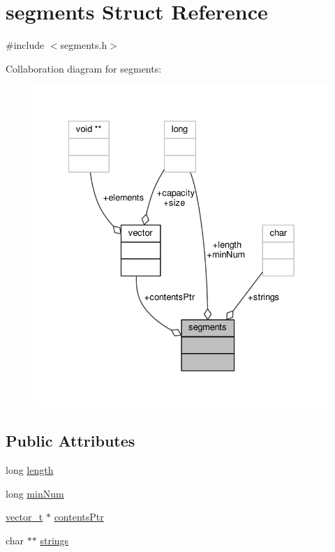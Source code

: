 \hypertarget{structsegments}{\section{segments Struct Reference}
\label{structsegments}
}


{\ttfamily \#include $<$segments.\-h$>$}



Collaboration diagram for segments\-:
\nopagebreak
\begin{figure}[H]
\begin{center}
\leavevmode
\includegraphics[width=331pt]{structsegments__coll__graph}
\end{center}
\end{figure}
\subsection*{Public Attributes}
\begin{DoxyCompactItemize}
\item 
long \hyperlink{structsegments_a93e128ff86f2537af043229cb7826645}{length}
\item 
long \hyperlink{structsegments_ab80a6eaf14782abccf02fa0fa13cc02b}{min\-Num}
\item 
\hyperlink{vector_8h_a5a1bca6fa9a3f18a2897623094d918da}{vector\-\_\-t} $\ast$ \hyperlink{structsegments_a62151c7ef854eed9610a05ce26b5acb6}{contents\-Ptr}
\item 
char $\ast$$\ast$ \hyperlink{structsegments_a723cadd4d1893965a09d9ec08baa04ba}{strings}
\end{DoxyCompactItemize}


